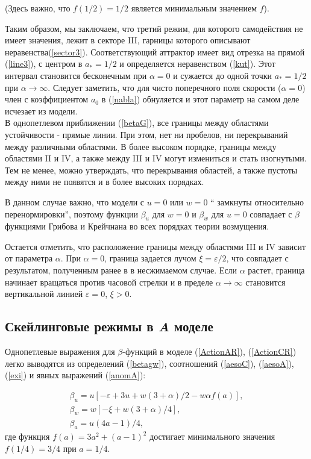 \documentclass[a4paper,10pt]{article}
\begin{document}
(Здесь важно, что $f(1/2)=1/2$  является минимальным значением $f$).

Таким образом, мы заключаем, что третий режим, для которого самодействия не имеет значения, лежит в секторе III, гарницы которого описывают неравенства(\ref{sector3}).
Соответствующий аттрактор имеет вид отрезка на прямой  (\ref{line3}), с центром в $a_{*}=1/2$  и определяется неравенством (\ref{kut}).
Этот интервал становится бесконечным при $\alpha=0$ и сужается до одной точки  $a_{*}=1/2$ при $\alpha\to\infty$.
Следует заметить, что для чисто поперечного поля скорости ($\alpha=0$) член с коэффициентом $a_{0}$ в (\ref{nabla}) обнуляется и этот параметр на самом деле исчезает из модели.\\

В однопетлевом приближении (\ref{betaG}), все границы между областями устойчивости - прямые линии. При этом, нет ни пробелов, ни перекрываний между различными областями.
В более высоком порядке, границы между областями II и IV, а также между III и IV могут измениться и стать изогнутыми.
Тем не менее, можно утверждать, что перекрывания областей, а также пустоты между ними не появятся и в более высоких порядках.

В данном случае важно, что модели с $u=0$  или  $w=0$  `` замкнуты относительно перенормировки'', поэтому функции $\beta_{u}$
для  $w=0$ и $\beta_{w}$ для $u=0$  совпадает с  $\beta$  функциями Грибова и Крейчнана во всех порядках теории возмущения.

Остается отметить, что расположение границы между областями III и IV зависит от параметра $\alpha$.
При $\alpha=0$, граница задается лучом $\xi=\varepsilon/2$, что совпадает с результатом, полученным ранее в \cite{AIK} в несжимаемом случае.
Если  $\alpha$ растет, граница начинает вращаться против часовой стрелки и в пределе $\alpha\to\infty$ становится вертикальной линией $\varepsilon=0$, $\xi>0$.

\subsection{Скейлинговые режимы в {\it A} моделе} \label{sec:GPA}


Однопетлевые выражения для $\beta$-функций в моделе (\ref{ActionAR}), (\ref{ActionCR}) легко выводятся из определений 
(\ref{betagw}), соотношений  (\ref{aesoC}), (\ref{aesoA}), (\ref{exi}) и явных выражений (\ref{anomA}):

\begin{eqnarray}
\beta_{u} = u \left[ -\varepsilon+ 3u + w(3+\alpha)/2 -w\alpha f(a) \right],
\nonumber \\
\beta_{w} = w \left[ -\xi + w(3+\alpha)/4 \right],
\nonumber \\
\beta_{a} = u(4a-1)/4,
\label{betaA}
\end{eqnarray}
где функция $f(a)=3a^{2}+(a-1)^{2}$ достигает минимального значения
$f(1/4) =3/4$ при $a=1/4$.
\end{document}
